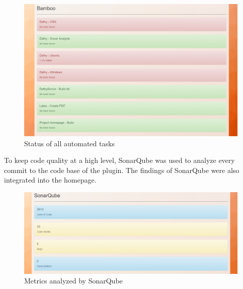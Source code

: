 \begin{figure}[H]
	\centering
	\includegraphics[width=1\textwidth]{img/homeBuilds}
	\caption{Status of all automated tasks}
	\label{fig:Bamboo Tasks}
\end{figure}
To keep code quality at a high level, SonarQube was used to analyze every commit to the code base of the plugin. The findings of SonarQube were also integrated into the homepage. \newline
\begin{figure}[H]
	\centering
	\includegraphics[width=1\textwidth]{img/homeSonar}
	\caption{Metrics analyzed by SonarQube}
	\label{fig:SonarQube}
\end{figure}

